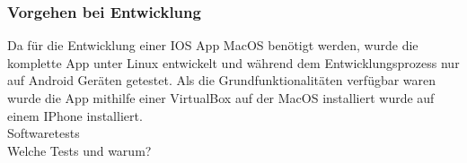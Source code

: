 \subsubsection{Vorgehen bei Entwicklung}
Da für die Entwicklung einer IOS App MacOS benötigt werden, wurde die komplette App unter Linux entwickelt und während dem Entwicklungsprozess nur auf 
Android Geräten getestet. Als die Grundfunktionalitäten verfügbar waren wurde die App mithilfe einer VirtualBox auf der MacOS installiert wurde auf einem 
IPhone installiert.\\   
Softwaretests   \\
Welche Tests und warum? \\   


    

